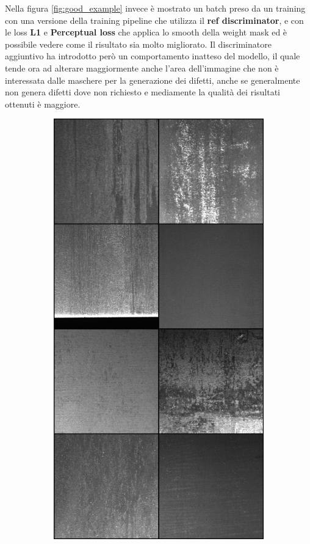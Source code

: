 Nella figura \ref{fig:good_example} invece è mostrato un batch preso da un training con una versione della training pipeline che utilizza il \textbf{ref discriminator},
e con le loss \textbf{L1} e \textbf{Perceptual loss} che applica lo smooth della weight mask ed è possibile vedere come il risultato sia molto migliorato.
Il discriminatore aggiuntivo ha introdotto però un comportamento inatteso del modello, 
il quale tende ora ad alterare maggiormente anche l'area dell'immagine che non è interessata 
dalle maschere per la generazione dei difetti, anche se generalmente non genera difetti dove non richiesto e mediamente la qualità dei risultati ottenuti
è maggiore.

\begin{figure}[htpb]
    \centering
    \begin{subfigure}[b]{0.3\textwidth}
        \includegraphics[width=\textwidth]{imgs/Coigan/results/buone/media_images_base_image_210000_e0ba01944dbb261374d3.png}

\end{subfigure}
\end{figure}
